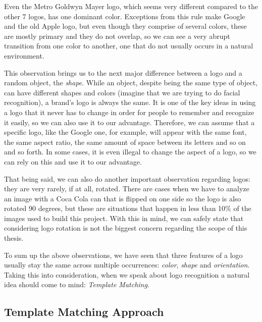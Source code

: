 
Even the Metro Goldwyn Mayer logo, which seems very different compared to the
other 7 logos, has one dominant color. Exceptions from this rule make Google
and the old Apple logo, but even though they comprise of several colors, these
are mostly primary and they do not overlap, so we can see a very abrupt
transition from one color to another, one that do not usually occurs in a
natural environment.

This observation brings us to the next major difference between a logo and a
random object, the \textit{shape}. While an object, despite being the same
type of object, can have different shapes and colors (imagine that we are
trying to do facial recognition), a brand's logo is always the same. It is one
of the key ideas in using a logo that it never has to change in order for
people to remember and recognize it easily, so we can also use it to our
advantage. Therefore, we can assume that a specific logo, like the Google one,
for example, will appear with the same font, the same aspect ratio, the
same amount of space between its letters and so on and so forth. In some
cases, it is even illegal to change the aspect of a logo, so we can rely on
this and use it to our advantage.

That being said, we can also do another important observation regarding logos:
they are very rarely, if at all, rotated. There are cases when we have to
analyze an image with a Coca Cola can that is flipped on one side so the logo
is also rotated 90 degrees, but these are situations that happen in less than
10\% of the images used to build this project. With this in mind, we can
safely state that considering logo rotation is not the biggest concern
regarding the scope of this thesis.

To sum up the above observations, we have seen that three features of a logo
usually stay the same across multiple occurrences: \textit{color},
\textit{shape} and \textit{orientation}. Taking this into consideration, when we
speak about logo recognition a natural idea should come to mind:
\textit{Template Matching}.

\subsection{Template Matching Approach}
\label{sub-sec:template-matching}

